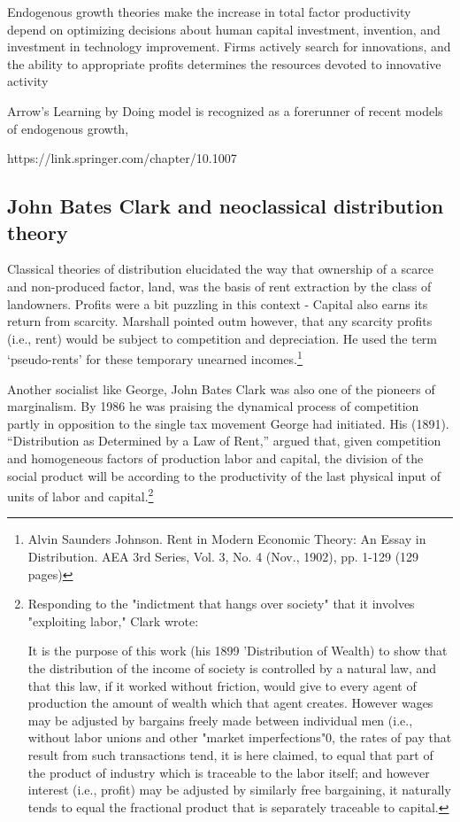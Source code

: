 Endogenous growth theories make the increase in total factor productivity depend on optimizing decisions about human capital investment, invention, and investment in technology improvement. Firms  actively search for innovations, and the ability to appropriate profits determines the resources devoted to innovative activity  %

Arrow's Learning by Doing model is recognized as a forerunner of recent models of endogenous growth, 

https://link.springer.com/chapter/10.1007%
 


  \subsection{John Bates Clark and neoclassical distribution theory}
  Classical theories of distribution elucidated the way that ownership of a scarce and non-produced factor, land, was the  basis of rent extraction by the class of landowners. Profits were a bit puzzling in this context - Capital also earns its return from scarcity. Marshall pointed outm however, that any scarcity profits (i.e., rent) would be subject to competition and depreciation.  He used the term `pseudo-rents' for these temporary  unearned incomes.\footnote{Alvin Saunders Johnson. Rent in Modern Economic Theory: An Essay in Distribution. AEA 3rd Series, Vol. 3, No. 4 (Nov., 1902), pp. 1-129 (129 pages)}

  
  Another socialist like George, John Bates Clark was also one of the pioneers of marginalism. By 1986 he was praising the dynamical process of competition partly in opposition to the single tax movement George had initiated.  His (1891). ``Distribution as Determined by a Law of Rent,'' argued that, given  competition and homogeneous factors of production labor and capital, the division of the social product will be according to the productivity of the last physical input of units of labor and capital.\footnote{Responding to the "indictment that hangs over society" that it involves "exploiting labor," Clark wrote:

    It is the purpose of this work (his 1899 'Distribution of Wealth) to show that the distribution of the income of society is controlled by a natural law, and that this law, if it worked without friction, would give to every agent of production the amount of wealth which that agent creates. However wages may be adjusted by bargains freely made between individual men (i.e., without labor unions and other "market imperfections"0, the rates of pay that result from such transactions tend, it is here claimed, to equal that part of the product of industry which is traceable to the labor itself; and however interest (i.e., profit) may be adjusted by similarly free bargaining, it naturally tends to equal the fractional product that is separately traceable to capital.} 
 

